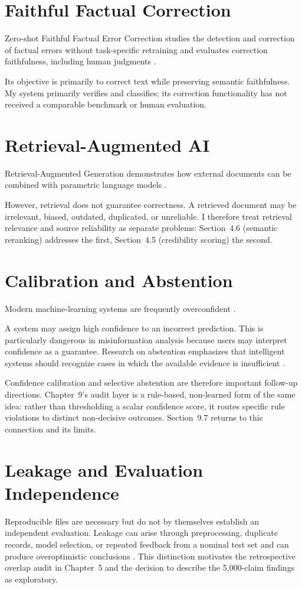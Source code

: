 \documentclass[12pt,a4paper,openany]{report}
\begin{document}
\section{Faithful Factual Correction}
Zero-shot Faithful Factual Error Correction studies the detection and correction of factual errors without task-specific retraining and evaluates correction faithfulness, including human judgments \citep{huang2023zeroshot}.

Its objective is primarily to correct text while preserving semantic faithfulness. My system primarily verifies and classifies; its correction functionality has not received a comparable benchmark or human evaluation.

\section{Retrieval-Augmented AI}
Retrieval-Augmented Generation demonstrates how external documents can be combined with parametric language models \citep{lewis2020rag}.

However, retrieval does not guarantee correctness. A retrieved document may be irrelevant, biased, outdated, duplicated, or unreliable. I therefore treat retrieval relevance and source reliability as separate problems: Section~4.6 (semantic reranking) addresses the first, Section~4.5 (credibility scoring) the second.

\section{Calibration and Abstention}
Modern machine-learning systems are frequently overconfident \citep{guo2017calibration}.

A system may assign high confidence to an incorrect prediction. This is particularly dangerous in misinformation analysis because users may interpret confidence as a guarantee. Research on abstention emphasizes that intelligent systems should recognize cases in which the available evidence is insufficient \citep{wen2024abstention}.

Confidence calibration and selective abstention are therefore important follow-up directions. Chapter~9's audit layer is a rule-based, non-learned form of the same idea: rather than thresholding a scalar confidence score, it routes specific rule violations to distinct non-decisive outcomes. Section~9.7 returns to this connection and its limits.

\section{Leakage and Evaluation Independence}
Reproducible files are necessary but do not by themselves establish an
independent evaluation. Leakage can arise through preprocessing, duplicate
records, model selection, or repeated feedback from a nominal test set and can
produce overoptimistic conclusions \citep{kapoor2023leakage}. This distinction
motivates the retrospective overlap audit in Chapter~5 and the decision to
describe the 5{,}000-claim findings as exploratory.
\end{document}
